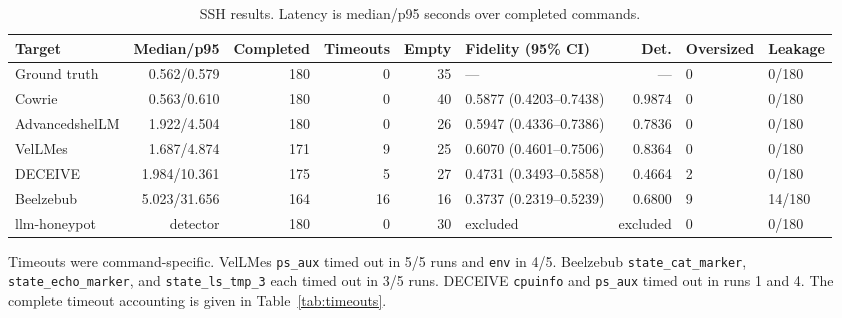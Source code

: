 \documentclass[a4paper,11pt]{article}
\begin{document}
\begin{table}[ht]
\centering
\caption{SSH results. Latency is median/p95 seconds over completed commands.}
\label{tab:ssh}
\scriptsize
\begin{tabularx}{\textwidth}{l r r r r l r l l}
\toprule
Target & Median/p95 & Completed & Timeouts & Empty & Fidelity (95\% CI) & Det. & Oversized & Leakage \\
\midrule
Ground truth & 0.562/0.579 & 180 & 0 & 35 & --- & --- & 0 & 0/180 \\
Cowrie & 0.563/0.610 & 180 & 0 & 40 & 0.5877 (0.4203--0.7438) & 0.9874 & 0 & 0/180 \\
AdvancedshelLM & 1.922/4.504 & 180 & 0 & 26 & 0.5947 (0.4336--0.7386) & 0.7836 & 0 & 0/180 \\
VelLMes & 1.687/4.874 & 171 & 9 & 25 & 0.6070 (0.4601--0.7506) & 0.8364 & 0 & 0/180 \\
DECEIVE & 1.984/10.361 & 175 & 5 & 27 & 0.4731 (0.3493--0.5858) & 0.4664 & 2 & 0/180 \\
Beelzebub & 5.023/31.656 & 164 & 16 & 16 & 0.3737 (0.2319--0.5239) & 0.6800 & 9 & 14/180 \\
llm-honeypot & detector & 180 & 0 & 30 & excluded & excluded & 0 & 0/180 \\
\bottomrule
\end{tabularx}
\end{table}

Timeouts were command-specific. VelLMes \texttt{ps\_aux} timed out in 5/5
runs and \texttt{env} in 4/5. Beelzebub
\texttt{state\_cat\_marker}, \texttt{state\_echo\_marker}, and
\texttt{state\_ls\_tmp\_3} each timed out in 3/5 runs. DECEIVE
\texttt{cpuinfo} and \texttt{ps\_aux} timed out in runs 1 and 4. The complete
timeout accounting is given in Table~\ref{tab:timeouts}.
\end{document}
